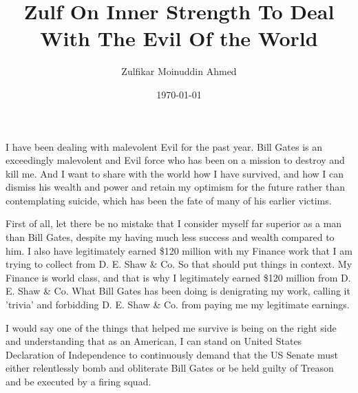 \documentclass{amsart}
\title{Zulf On Inner Strength To Deal With The Evil Of the World}
\author{Zulfikar Moinuddin Ahmed}
\date{\today}
\begin{document}
\maketitle

I have been dealing with malevolent Evil for the past year.  Bill Gates is an exceedingly malevolent and Evil force who has been on a mission to destroy and kill me.  And I want to share with the world how I have survived, and how I can dismiss his wealth and power and retain my optimism for the future rather than contemplating suicide, which has been the fate of many of his earlier victims.

First of all, let there be no mistake that I consider myself far superior as a man than Bill Gates, despite my having much less success and wealth compared to him.  I also have legitimately earned \$120 million with my Finance work that I am trying to collect from D. E. Shaw \& Co.  So that should put things in context.  My Finance is world class, and that is why I legitimately earned \$120 million from D. E. Shaw \& Co.  What Bill Gates has been doing is denigrating my work, calling it 'trivia' and forbidding D. E. Shaw \& Co. from paying me my legitimate earnings. 

I would say one of the things that helped me survive is being on the right side and understanding that as an American, I can stand on United States Declaration of Independence to continuously demand that the US Senate must either relentlessly bomb and obliterate Bill Gates or be held guilty of Treason and be executed by a firing squad.
\end{document}
